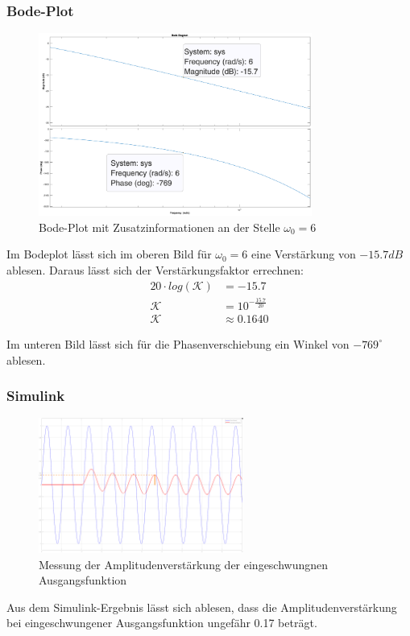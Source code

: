 \subsubsection{Bode-Plot}
\begin{figure}[H]
    \label{fig:bodePlot}
    \label{fig:lassmich}
    \centering
    \includegraphics[width=0.8\textwidth]{Bilder/bodeMitZeichen.eps}
    \caption{Bode-Plot mit Zusatzinformationen an der Stelle $ \omega_0 = 6$}
 \end{figure}

Im Bodeplot lässt sich im oberen Bild für $\omega_0 = 6$ eine Verstärkung von $-15.7 dB$ ablesen. Daraus lässt sich der Verstärkungsfaktor errechnen:
\begin{align*}
    20 \cdot log(\mathcal{K}) &= - 15.7\\
        \mathcal{K} &= 10^{-\frac{15.7}{20}}\\
        \mathcal{K} & \approx 0.1640
\end{align*}

Im unteren Bild lässt sich für die Phasenverschiebung ein Winkel von $-769^{\circ}$ ablesen.


\subsubsection{Simulink}


\begin{figure}[H]
    \centering
    \includegraphics[width=0.6\textwidth]{Bilder/Simulink-Amplitude.png}
    \caption[width=0.6\textwidth]{Messung der Amplitudenverstärkung der eingeschwungnen Ausgangsfunktion}
 \end{figure}
 Aus dem Simulink-Ergebnis lässt sich ablesen, dass die Amplitudenverstärkung bei eingeschwungener Ausgangsfunktion ungefähr 0.17 beträgt.

